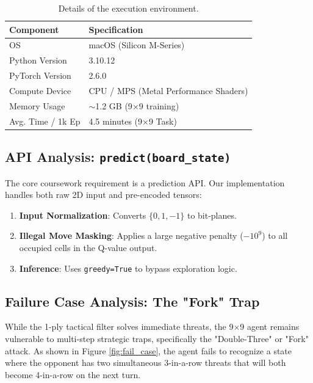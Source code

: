 \documentclass[9pt,a4paper,twocolumn,twoside]{rho-class/rho}
\begin{document}
        \begin{table}[h]
            \centering
            \begin{tabular}{ll}
                \toprule
                Component & Specification \\
                \midrule
                OS & macOS (Silicon M-Series) \\
                Python Version & 3.10.12 \\
                PyTorch Version & 2.6.0 \\
                Compute Device & CPU / MPS (Metal Performance Shaders) \\
                Memory Usage & $\sim$1.2 GB (9$\times$9 training) \\
                Avg. Time / 1k Ep & 4.5 minutes (9$\times$9 Task) \\
                \bottomrule
            \end{tabular}
            \caption{Details of the execution environment.}
            \label{tab:env}
        \end{table}

    \subsection{API Analysis: \texttt{predict(board\_state)}}
        The core coursework requirement is a prediction API. Our implementation handles both raw 2D input and pre-encoded tensors:
        \begin{enumerate}
            \item \textbf{Input Normalization}: Converts $\{0, 1, -1\}$ to bit-planes.
            \item \textbf{Illegal Move Masking}: Applies a large negative penalty ($-10^{9}$) to all occupied cells in the Q-value output.
            \item \textbf{Inference}: Uses \texttt{greedy=True} to bypass exploration logic.
        \end{enumerate}

    \subsection{Failure Case Analysis: The "Fork" Trap}
        While the 1-ply tactical filter solves immediate threats, the 9$\times$9 agent remains vulnerable to multi-step strategic traps, specifically the "Double-Three" or "Fork" attack. As shown in Figure \ref{fig:fail_case}, the agent fails to recognize a state where the opponent has two simultaneous 3-in-a-row threats that will both become 4-in-a-row on the next turn.
\end{document}
